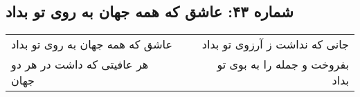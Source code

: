 \begin{center}
\section*{شماره ۴۳: عاشق که همه جهان به روی تو بداد}
\label{sec:043}
\begin{longtable}{l p{0.5cm} r}
عاشق که همه جهان به روی تو بداد
&&
جانی که نداشت ز آرزوی تو بداد
\\
هر عافیتی که داشت در هر دو جهان
&&
بفروخت و جمله را به بوی تو بداد
\\
\end{longtable}
\end{center}
